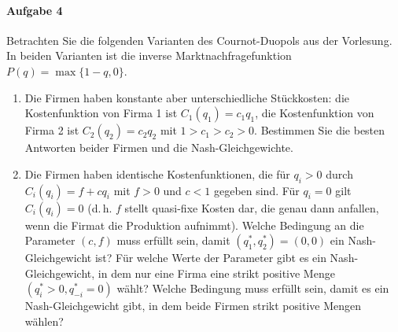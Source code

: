\paragraph{Aufgabe 4}%
\label{par:serie_5_aufgabe_4}

Betrachten Sie die folgenden Varianten des Cournot-Duopols aus der Vorlesung.
In beiden Varianten ist die inverse Marktnachfragefunktion $P(q) = \max\{1-q, 0\}$.
\begin{enumerate}
  \item Die Firmen haben konstante aber unterschiedliche Stückkosten:
    die Kostenfunktion von Firma 1 ist $C_1(q_1) = c_1 q_1$,
    die Kostenfunktion von Firma 2 ist $C_2(q_2) = c_2 q_2$
    mit $1 > c_1 > c_2 > 0$.
    Bestimmen Sie die besten Antworten beider Firmen und die Nash-Gleichgewichte.
  \item Die Firmen haben identische Kostenfunktionen,
    die für $q_i > 0$ durch $C_i(q_i) = f+c q_i$ mit $f > 0$ und $c < 1$ gegeben sind.
    Für $q_i = 0$ gilt $C_i(q_i) = 0$ (d.\,h. $f$ stellt quasi-fixe Kosten dar, die genau
    dann anfallen, wenn die Firmat die Produktion aufnimmt).
    Welche Bedingung an die Parameter $(c,f)$ muss erfüllt sein,
    damit $(q_1^*, q_2^*) = (0,0)$ ein Nash-Gleichgewicht ist?
    Für welche Werte der Parameter gibt es ein Nash-Gleichgewicht, in dem nur eine Firma
    eine strikt positive Menge $(q_i^* > 0, q_{-i}^* = 0)$ wählt?
    Welche Bedingung muss erfüllt sein, damit es ein Nash-Gleichgewicht gibt, in dem beide
    Firmen strikt positive Mengen wählen?
\end{enumerate}
